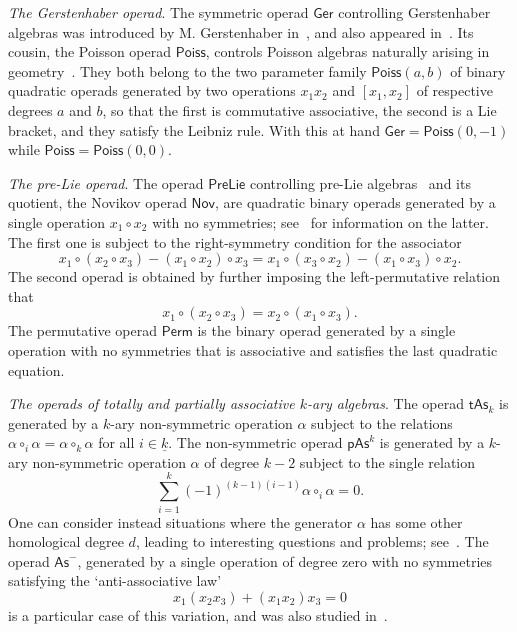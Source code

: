 \emph{The Gerstenhaber operad}. The symmetric operad
$\mathsf{Ger}$ controlling Gerstenhaber algebras was introduced
by M. Gerstenhaber in~\cite{Gerstenhaber1963}, and also
appeared in~\cite{Koszul1985}. Its cousin,
the Poisson operad $\mathsf{Poiss}$, controls Poisson
algebras naturally arising in geometry~\cite{Mackenzie1994,Bhaskara1988,Weinstein1998}. 
They both belong to the two parameter
family $\mathsf{Poiss}(a,b)$ of binary quadratic operads generated
by two operations $x_1x_2$ and $[x_1,x_2]$ of respective degrees
$a$ and $b$, so that
the first is commutative associative, the second is a Lie
bracket, and they satisfy the Leibniz rule. With this
at hand $\mathsf{Ger} =\mathsf{Poiss}(0,-1)$ while  
$\mathsf{Poiss} = \mathsf{Poiss}(0,0)$.

\smallskip

\emph{The pre-Lie operad}. The operad $\mathsf{PreLie}$ controlling
pre-Lie algebras~\cite{Manchon2011} and its
quotient, the Novikov operad $\mathsf{Nov}$, are quadratic
binary operads generated by a single operation $x_1\circ x_2$
with no symmetries; see~\cite{Umirbaev2021,Dzhumadildaev2002,
Dzhumadildaev2011}
for information on the latter.
The first one is subject to the right-symmetry
condition for the associator
\[ 
x_1\circ (x_2\circ x_3) - (x_1\circ x_2)\circ x_3	=
x_1\circ (x_3\circ x_2) - (x_1\circ x_3)\circ x_2.
\]
The second 
operad is obtained by further imposing the left-permutative
relation that 
\[ x_1\circ (x_2\circ x_3) = x_2\circ (x_1\circ x_3).\]
The permutative operad $\mathsf{Perm}$ is the binary
operad generated by a single operation with no symmetries
that is associative and satisfies the last quadratic equation. 

\smallskip

\emph{The operads of totally and partially associative $k$-ary algebras}. 
The operad $\mathsf{tAs}_k$ is generated
by a $k$-ary non-symmetric operation $\alpha$ subject to
the relations $\alpha \circ_i \alpha =\alpha\circ_k \alpha$
for all $i\in \underline{k}$.
The non-symmetric operad $\mathsf{pAs}^k$ is generated
by a $k$-ary non-symmetric operation $\alpha$ of degree $k-2$
subject to the single relation
\[ 
	\sum_{i=1}^k (-1)^{(k-1)(i-1)} \alpha\circ_i \alpha = 0.\]
One can consider instead situations where the generator $\alpha$
has some other homological degree $d$, leading to interesting
questions and problems; see~\cite{Markl2011,Remm2010,Dotsenko2020a}. 
The operad  $\mathsf{As}^-$,
generated by a single operation of degree zero with no symmetries
satisfying the `anti-associative law'
\[ x_1(x_2x_3) + (x_1x_2)x_3 = 0 \]
is a particular case of this variation, and was also studied
in~\cite{Markl2011}.


